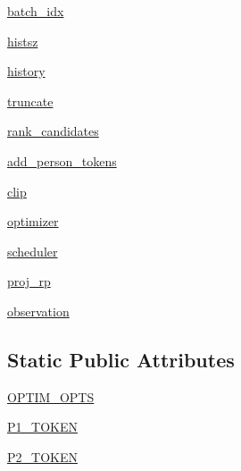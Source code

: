 \begin{DoxyCompactItemize}
\item 
\hyperlink{classparlai_1_1agents_1_1legacy__agents_1_1seq2seq_1_1torch__agent__v1_1_1TorchAgent_a31b5e2e435a70f40ce155dabe831d41c}{batch\+\_\+idx}
\item 
\hyperlink{classparlai_1_1agents_1_1legacy__agents_1_1seq2seq_1_1torch__agent__v1_1_1TorchAgent_add94f2eee8d2a4aba14869587e9dd4d3}{histsz}
\item 
\hyperlink{classparlai_1_1agents_1_1legacy__agents_1_1seq2seq_1_1torch__agent__v1_1_1TorchAgent_a858bd7d01a3d6298f2e2f72efcf73953}{history}
\item 
\hyperlink{classparlai_1_1agents_1_1legacy__agents_1_1seq2seq_1_1torch__agent__v1_1_1TorchAgent_ac0286e4dbf6dc71bda0c364851de5f22}{truncate}
\item 
\hyperlink{classparlai_1_1agents_1_1legacy__agents_1_1seq2seq_1_1torch__agent__v1_1_1TorchAgent_ab768649f4b4a30eb9a75fedde5a9935f}{rank\+\_\+candidates}
\item 
\hyperlink{classparlai_1_1agents_1_1legacy__agents_1_1seq2seq_1_1torch__agent__v1_1_1TorchAgent_a81f970d715f2525ad342330a28703c5c}{add\+\_\+person\+\_\+tokens}
\item 
\hyperlink{classparlai_1_1agents_1_1legacy__agents_1_1seq2seq_1_1torch__agent__v1_1_1TorchAgent_a99254a4351798f66797e0a5a8ff855d5}{clip}
\item 
\hyperlink{classparlai_1_1agents_1_1legacy__agents_1_1seq2seq_1_1torch__agent__v1_1_1TorchAgent_a2524bfb4b01626290e6fa26be52f2a80}{optimizer}
\item 
\hyperlink{classparlai_1_1agents_1_1legacy__agents_1_1seq2seq_1_1torch__agent__v1_1_1TorchAgent_aea16ae8f9536959afd6e7434d418a719}{scheduler}
\item 
\hyperlink{classparlai_1_1agents_1_1legacy__agents_1_1seq2seq_1_1torch__agent__v1_1_1TorchAgent_a3f1da649c485f406076be7bf84b2d4ee}{proj\+\_\+rp}
\item 
\hyperlink{classparlai_1_1agents_1_1legacy__agents_1_1seq2seq_1_1torch__agent__v1_1_1TorchAgent_a04fa334c086cf9afa815a44f1948e625}{observation}
\end{DoxyCompactItemize}
\subsection*{Static Public Attributes}
\begin{DoxyCompactItemize}
\item 
\hyperlink{classparlai_1_1agents_1_1legacy__agents_1_1seq2seq_1_1torch__agent__v1_1_1TorchAgent_a57acf9a56d383f7257fd7f4b0ce21537}{O\+P\+T\+I\+M\+\_\+\+O\+P\+TS}
\item 
\hyperlink{classparlai_1_1agents_1_1legacy__agents_1_1seq2seq_1_1torch__agent__v1_1_1TorchAgent_ad167df27f0b63077bf1d43e75c20301e}{P1\+\_\+\+T\+O\+K\+EN}
\item 
\hyperlink{classparlai_1_1agents_1_1legacy__agents_1_1seq2seq_1_1torch__agent__v1_1_1TorchAgent_a002618d2202fb2dd61283f0a2b612a4c}{P2\+\_\+\+T\+O\+K\+EN}
\end{DoxyCompactItemize}


